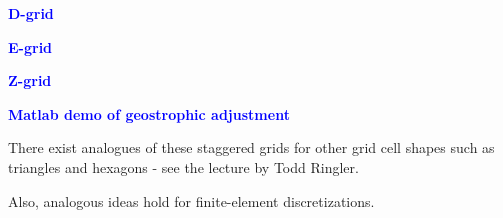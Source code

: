 \documentclass[a4]{seminar}
\newcommand{\B}[1]{\textcolor{blue}{#1}}
\begin{document}

\begin{slide}

\begin{minipage}{44mm}
\B{\bf D-grid}

\end{minipage}
\begin{minipage}{44mm}
\B{\bf E-grid}

\end{minipage}

\vspace{2mm}

\begin{minipage}{44mm}
\B{\bf Z-grid}

\end{minipage}


\end{slide}


\begin{slide}


\begin{center}
\B{\bf Matlab demo of geostrophic adjustment}
\end{center}


\end{slide}


\begin{slide}

There exist analogues of these staggered grids for other grid cell shapes
such as triangles and hexagons - see the lecture by Todd Ringler.

\vspace{4mm}

Also, analogous ideas hold for finite-element discretizations.

\end{slide}

\end{document}
